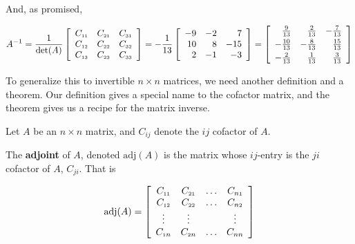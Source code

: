 \documentclass{ximera}
\begin{document}
And, as promised,

\[ A^{-1} = \dfrac{1}{\det(A)} \left[ \begin{array}{ccc} C_{\mbox{\tiny$11$}} & C_{\mbox{\tiny$21$}} & C_{\mbox{\tiny$31$}} \\ C_{\mbox{\tiny$12$}} & C_{\mbox{\tiny$22$}} & C_{\mbox{\tiny$32$}} \\ C_{\mbox{\tiny$13$}} & C_{\mbox{\tiny$23$}} & C_{\mbox{\tiny$33$}} \\ \end{array} \right] = -\dfrac{1}{13} \left[ \begin{array}{rrr} -9 & -2 & 7\\ 10 & 8 & -15 \\ 2  &  -1 &  -3 \\ \end{array} \right]  =  \left[ \begin{array}{rrr} \frac{9}{13} & \frac{2}{13} & -\frac{7}{13} \\[3pt] -\frac{10}{13} & -\frac{8}{13} & \frac{15}{13} \\[3pt] -\frac{2}{13} & \frac{1}{13} & \frac{3}{13} \\ \end{array} \right] \]

To generalize this to invertible $n \times n$ matrices, we need another definition and a theorem.  Our definition gives a special name to the cofactor matrix, and the theorem gives us a recipe for the matrix inverse.

\smallskip

\colorbox{ResultColor}{\bbm

\begin{defn}  \label{matrixadjoint} Let $A$ be an $n \times n$ matrix, and $C_{ij}$ denote the $ij$ cofactor of $A$.  

The \textbf{adjoint} of $A$, denoted $\text{adj}(A)$ is the matrix whose $ij$-entry is the $ji$ cofactor of $A$, $C_{ji}$.  That is

\[ \text{adj}(A) = \left[
\begin{array}{cccc} 
C_{\mbox{\tiny$11$}} & C_{\mbox{\tiny$21$}} & \ldots & C_{n\mbox{\tiny$1$}} \\  
C_{\mbox{\tiny$12$}} & C_{\mbox{\tiny$22$}} & \ldots & C_{n\mbox{\tiny$2$}} \\
   \vdots  & \vdots & & \vdots \\
C_{\mbox{\tiny$1$}n} & C_{\mbox{\tiny$2$}n} & \ldots & C_{nn} \\  \end{array} \right] \]


\end{defn}

\ebm}
\end{document}
